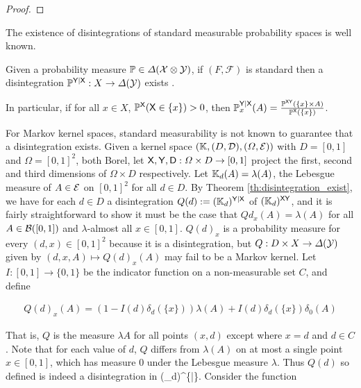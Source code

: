 \begin{proof}

\end{proof}

The existence of disintegrations of standard measurable probability spaces is well known.

\begin{theorem}\label{th:disintegration_exist}
Given a probability measure $\mathbb{P}\in \Delta(\mathcal{X}\otimes \mathcal{Y})$, if $(F,\mathcal{F})$ is standard then a disintegration $\mathbb{P}^{\mathsf{Y}|\mathsf{X}}:X\to \Delta(\mathcal{Y})$ exists \citep{cinlar_probability_2011}.
\end{theorem}

In particular, if for all $x\in X$, $\mathbb{P}^{\mathsf{X}}(\mathsf{X}\in\{x\})>0$, then $\mathbb{P}^{\mathsf{Y}|\mathsf{X}}_x(A) = \frac{\mathbb{P}^{\mathsf{X}\mathsf{Y}}(\{x\}\times A)}{\mathbb{P}^{\mathsf{X}}(\{x\})}$.

For Markov kernel spaces, standard measurability is not known to guarantee that a disintegration exists. Given a kernel space $(\mathbb{K},(D,\mathcal{D}),(\Omega,\mathcal{E}))$ with $D=[0,1]$ and $\Omega=[0,1]^2$, both Borel, let $\mathsf{X},\mathsf{Y},\mathsf{D}:\Omega\times D\to [0,1]$ project the first, second and third dimensions of $\Omega\times D$ respectively. Let $\mathbb{K}_d(A) = \lambda(A)$, the Lebesgue measure of $A\in \mathcal{E}$ on $[0,1]^2$ for all $d\in D$. By Theorem \ref{th:disintegration_exist}, we have for each $d\in D$ a disintegration $Q(d):=(\mathbb{K}_d)^{\mathsf{Y}|\mathsf{X}}$ of $(\mathbb{K}_d)^{\mathsf{X}\mathsf{Y}}$, and it is fairly straightforward to show it must be the case that $Qd_x(A)=\lambda(A)$ for all $A\in \mathcal{B}([0,1])$ and $\lambda$-almost all $x\in [0,1]$. $Q(d)_x$ is a probability measure for every $(d,x)\in [0,1]^2$ because it is a disintegration, but $Q:D\times X\to \Delta(\mathcal{Y})$ given by $(d,x,A)\mapsto Q(d)_x(A)$ may fail to be a Markov kernel. Let $I:[0,1]\to \{0,1\}$ be the indicator function on a non-measurable set $C$, and define

\begin{align}
	Q(d)_{x}(A) = (1-I(d)\delta_{d}(\{x\}))\lambda(A) + I(d)\delta_{d}(\{x\})\delta_{0}(A)\label{eq:non_measurable_disint}
\end{align}

That is, $Q$ is the measure $\lambda{A}$ for all points $(x,d)$ except where $x=d$ and $d\in C$. Note that for each value of $d$, $Q$ differs from $\lambda(A)$ on at most a single point $x\in[0,1]$, which has measure $0$ under the Lebesgue measure $\lambda$. Thus $Q(d)$ so defined is indeed a disintegration in (_d)^{\{|\}}. Consider the function

